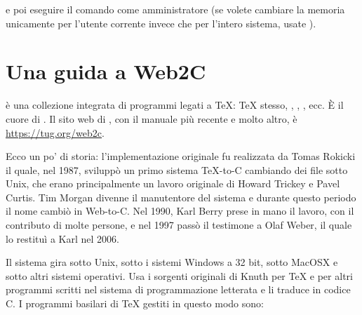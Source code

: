 \documentclass{article}
\begin{document}
\noindent e poi eseguire il comando  come
amministratore (se volete cambiare la memoria unicamente per l'utente
corrente invece che per l'intero sistema, usate ).


\section{Una guida a Web2C}

\Webc{} è una collezione integrata di programmi legati a \TeX: \TeX{}
stesso, \MF{}, \MP, \BibTeX{}, ecc. È il cuore di \TL{}. Il sito web di
\Webc{}, con il manuale più recente e molto altro, è
\url{https://tug.org/web2c}.

Ecco un po' di storia: l'implementazione originale fu realizzata da Tomas
Rokicki il quale, nel 1987, sviluppò un primo sistema \TeX{}-to-C
cambiando dei file sotto Unix, che erano principalmente un lavoro
originale di Howard Trickey e Pavel Curtis. Tim Morgan divenne il
manutentore del sistema e durante questo periodo il nome cambiò in
Web-to-C\@. Nel 1990, Karl Berry prese in mano il lavoro, con il
contributo di molte persone, e nel 1997 passò il testimone a Olaf Weber,
il quale lo restituì a Karl nel 2006.

Il sistema \Webc{} gira sotto Unix, sotto i sistemi Windows a 32 bit,
sotto MacOSX{} e sotto altri sistemi operativi. Usa i sorgenti originali
di Knuth per \TeX{} e per altri programmi scritti nel sistema di
programmazione letterata \web{} e li traduce in codice C. I programmi
basilari di \TeX{} gestiti in questo modo sono:
\end{document}
